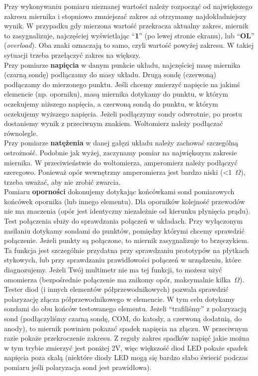 Przy wykonywaniu pomiaru nieznanej wartości należy rozpocząć od największego zakresu miernika i stopniowo zmniejszać zakres aż
otrzymamy najdokładniejszy wynik. W przypadku gdy mierzona wartość przekracza aktualny zakres, miernik to zasygnalizuje, najczęściej
wyświetlając ``\textbf{1}'' (po lewej stronie ekranu), lub ``\textbf{OL}'' (\emph{overload}). Oba znaki oznaczają to samo, czyli wartość powyżej zakresu. W takiej sytuacji trzeba przełączyć zakres na większy.
\\

Przy pomiarze \textbf{napięcia} w danym punkcie układu, najczęściej masę miernika (czarną sondę)
podłączamy do masy układu. Drugą sondę (czerwoną) podłączamy do mierzonego punktu. Jeśli chcemy zmierzyć napięcie na jakimś elemencie (np. oporniku),
masą miernika dotykamy do punktu, w którym oczekujemy niższego napięcia, a czerwoną sondą do punktu, w którym oczekujemy
wyższego napięcia. Jeżeli podłączymy sondy odwrotnie, po prostu dostaniemy wynik z przeciwnym znakiem. Woltomierz należy podłączać równolegle.
\\

Przy pomiarze \textbf{natężenia} w danej gałęzi układu należy zachować szczególną ostrożność. Podobnie jak wyżej, zaczynamy pomiar na największym
zakresie miernika. W przeciwieństwie do woltomierza, amperomierz należy podłączyć szeregowo. Ponieważ opór wewnętrzny amperomierza jest bardzo
niski (<1~$\Omega$), trzeba uważać, aby nie zrobić zwarcia.
\\

Pomiaru \textbf{oporności} dokonujemy dotykając końcówkami sond pomiarowych końcówek opornika (lub innego elementu). Dla oporników kolejność przewodów nie ma znaczenia
(opór jest identyczny niezależnie od kierunku płynięcia prądu).
\\

Test połączenia służy do sprawdzania połączeń w układach. Przy wyłączonym zasilaniu dotykamy sondami do punktów, pomiędzy którymi chcemy
sprawdzić połączenie. Jeżeli punkty są połączone, to miernik zasygnalizuje to brzęczykiem. Ta funkcja jest szczególnie przydatna przy sprawdzaniu
prototypów na płytkach stykowych, lub przy sprawdzaniu prawidłowości połączeń w urządzeniu, które diagnozujemy. Jeżeli Twój
multimetr nie ma tej funkcji, to możesz użyć omomierza (bezpośrednie połączenie ma znikomy opór, maksymalnie kilka~$\Omega$).
\\

Tester diod (i innych elementów półprzewodnikowych) pozwala sprawdzić polaryzację złącza półprzewodnikowego w elemencie. W tym celu dotykamy
sondami do obu końców testowanego elementu. Jeżeli ``trafiliśmy'' z polaryzacją sond (podłączyliśmy czarną sondę, COM, do katody, a czerwoną
dodatnią, do anody), to miernik powinien pokazać spadek napięcia na złączu.
W przeciwnym razie pokaże przekroczenie zakresu. Z reguły zakres spadków napięć jakie można w tym trybie zmierzyć jest poniżej 2V, więc
większość diod LED pokaże spadek napięcia poza skalą (niektóre diody LED mogą się bardzo słabo świecić podczas pomiaru jeśli polaryzacja
sond jest prawidłowa).
\\

